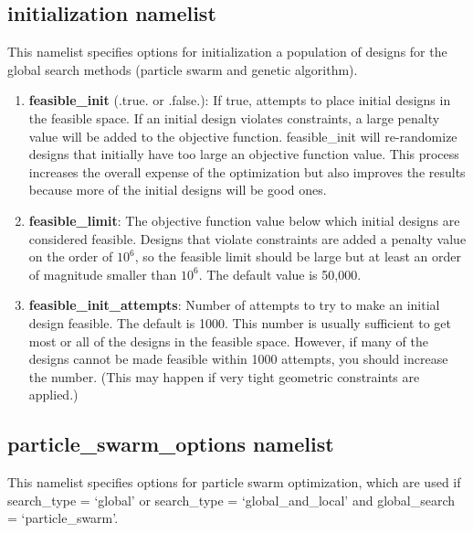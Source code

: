 \documentclass[11pt]{article}
\begin{document}
\subsection{initialization namelist}

This namelist specifies options for initialization a population of designs for the global
search methods (particle swarm and genetic algorithm).

\begin{enumerate}
\item{\textbf{feasible\_init} (.true. or .false.): If true, attempts to place initial
designs in the feasible space.  If an initial design violates constraints, a large penalty
value will be added to the objective function.  feasible\_init will re-randomize
designs that initially have too large an objective function value.  
This process increases the overall expense of the optimization but also improves the 
results because more of the initial designs will be good ones.}
\item{\textbf{feasible\_limit}: The objective function value below which initial
designs are considered feasible.  Designs that violate constraints are added a penalty
value on the order of $10^6$, so the feasible limit should be large but at least an order
of magnitude smaller than $10^6$.  The default value is 50,000.}
\item{\textbf{feasible\_init\_attempts}: Number of attempts to try to make an initial
design feasible.  The default is 1000. This number is usually sufficient to get most or
all of the designs in the feasible space.  However, if many of the designs cannot be made
feasible within 1000 attempts, you should increase the number. (This may happen if very
tight geometric constraints are applied.)}
\end{enumerate}

\subsection{particle\_swarm\_options namelist}

This namelist specifies options for particle swarm optimization, which are used if
search\_type = `global' or search\_type = `global\_and\_local' and global\_search =
`particle\_swarm'.
\end{document}
